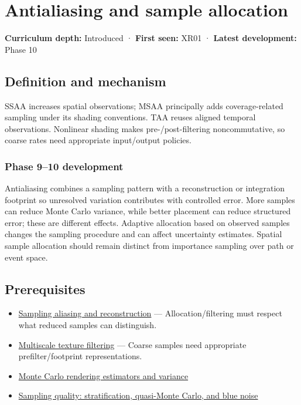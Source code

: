 \hypertarget{appendix-4192b2bdd21e}{}\label{referencestart:appendix-4192b2bdd21e}
\section{Antialiasing and sample allocation}\label{appendix-4192b2bdd21e-antialiasing-and-sample-allocation}

\textbf{Curriculum depth:} Introduced · \textbf{First seen:} XR01 · \textbf{Latest development:} Phase 10

\subsection{Definition and mechanism}\label{appendix-4192b2bdd21e-definition-and-mechanism}

SSAA increases spatial observations; MSAA principally adds coverage-related sampling under its shading conventions. TAA reuses aligned temporal observations. Nonlinear shading makes pre-/post-filtering noncommutative, so coarse rates need appropriate input/output policies.

\subsubsection{Phase 9--10 development}\label{appendix-4192b2bdd21e-phase-910-development}

Antialiasing combines a sampling pattern with a reconstruction or integration footprint so unresolved variation contributes with controlled error. More samples can reduce Monte Carlo variance, while better placement can reduce structured error; these are different effects. Adaptive allocation based on observed samples changes the sampling procedure and can affect uncertainty estimates. Spatial sample allocation should remain distinct from importance sampling over path or event space.

\subsection{Prerequisites}\label{appendix-4192b2bdd21e-prerequisites}

\begin{itemize}
\tightlist
\item
  \hyperref[appendix-6a7869dd79a6]{Sampling aliasing and reconstruction} --- Allocation/filtering must respect what reduced samples can distinguish.
\item
  \hyperref[appendix-b677a85ba76f]{Multiscale texture filtering} --- Coarse samples need appropriate prefilter/footprint representations.
\item
  \hyperref[appendix-031e02bf28af]{Monte Carlo rendering estimators and variance}
\item
  \hyperref[appendix-9f693ffd82bc]{Sampling quality: stratification, quasi-Monte Carlo, and blue noise}
\end{itemize}

